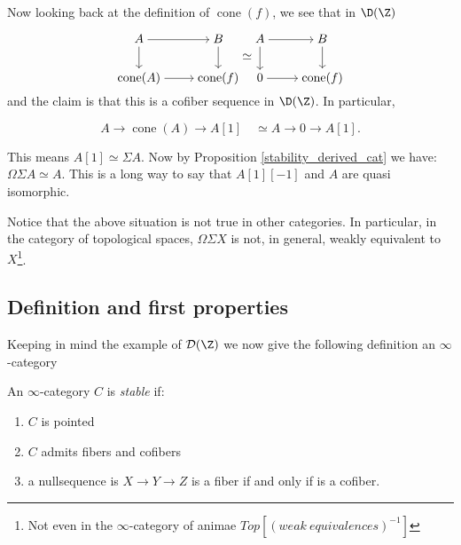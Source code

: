 Now looking back at the definition of $\operatorname{cone}(f)$, we see that in $\D(\Z)$



\[
\begin{tikzcd}[cramped,sep=small]
	A && B \\
	\\
	{\operatorname{cone}(A)} && {\operatorname{cone}(f)}
	\arrow[from=1-1, to=1-3]
	\arrow[from=1-1, to=3-1]
	\arrow[from=1-3, to=3-3]
	\arrow[from=3-1, to=3-3]
\end{tikzcd} \simeq \begin{tikzcd}[cramped,sep=small]
	A && B \\
	\\
	{0} && {\operatorname{cone}(f)}
	\arrow[from=1-1, to=1-3]
	\arrow[from=1-1, to=3-1]
	\arrow[from=1-3, to=3-3]
	\arrow[from=3-1, to=3-3]
\end{tikzcd} \]
and the claim is that this is a cofiber sequence in $\D(\Z)$. In particular,

\[A \to \operatorname{cone}(A)\to A[1]\quad\simeq A \to 0\to A[1].\]

This means $A[1]\simeq \Sigma A.$ Now by Proposition \ref{stability_derived_cat} we have: $\Omega\Sigma A\simeq A.$  This is a long way to say that $A[1][-1]$ and $A$ are quasi isomorphic.

\begin{war}
    Notice that the above situation is not true in other categories. In particular, in the category of topological spaces, $\Omega\Sigma X$ is not, in general, weakly equivalent to $X$\footnote{Not even in the $\infty$-category of animae $Top[(weak\ equivalences)^{-1}]$}.
\end{war}

\subsection{Definition and first properties}
Keeping in mind the example of $\mathcal{D}(\Z)$ we now give the following definition an $\infty$-category

    \begin{definition}
    An $\infty$-category $C$ is \emph{stable} if:
    \begin{enumerate}[label=\arabic*)]
        \item $C$ is pointed
        \item $C$ admits fibers and cofibers
        \item a nullsequence is $X\to Y\to Z$ is a fiber if and only if is a cofiber.
    \end{enumerate}
\end{definition}

